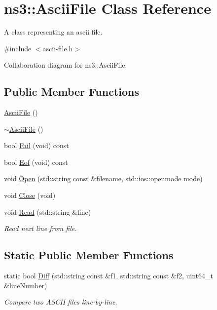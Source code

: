 \hypertarget{classns3_1_1AsciiFile}{}\section{ns3\+:\+:Ascii\+File Class Reference}
\label{classns3_1_1AsciiFile}


A class representing an ascii file.  




{\ttfamily \#include $<$ascii-\/file.\+h$>$}



Collaboration diagram for ns3\+:\+:Ascii\+File\+:
\subsection*{Public Member Functions}
\begin{DoxyCompactItemize}
\item 
\hyperlink{classns3_1_1AsciiFile_a35b08cdb02eeddb719f6ab959f8bd117}{Ascii\+File} ()
\item 
\hyperlink{classns3_1_1AsciiFile_ab62b74e325523633ae9101661f86be15}{$\sim$\+Ascii\+File} ()
\item 
bool \hyperlink{classns3_1_1AsciiFile_ac43b074a5970c4131e19fc3b47a3d72f}{Fail} (void) const 
\item 
bool \hyperlink{classns3_1_1AsciiFile_a86bbbed071932b9680b8ab8aa23f110c}{Eof} (void) const 
\item 
void \hyperlink{classns3_1_1AsciiFile_a2506b96ec3de521f22918a6757dadac4}{Open} (std\+::string const \&filename, std\+::ios\+::openmode mode)
\item 
void \hyperlink{classns3_1_1AsciiFile_a1ea86a31e519693b2d9883263b670580}{Close} (void)
\item 
void \hyperlink{classns3_1_1AsciiFile_ac28451e3e33aed6dc216fc9531fd9737}{Read} (std\+::string \&line)
\begin{DoxyCompactList}\small\item\em Read next line from file. \end{DoxyCompactList}\end{DoxyCompactItemize}
\subsection*{Static Public Member Functions}
\begin{DoxyCompactItemize}
\item 
static bool \hyperlink{classns3_1_1AsciiFile_a49e6f6ba09c38555aabddde5b2f3ffda}{Diff} (std\+::string const \&f1, std\+::string const \&f2, uint64\+\_\+t \&line\+Number)
\begin{DoxyCompactList}\small\item\em Compare two A\+S\+C\+II files line-\/by-\/line. \end{DoxyCompactList}\end{DoxyCompactItemize}
